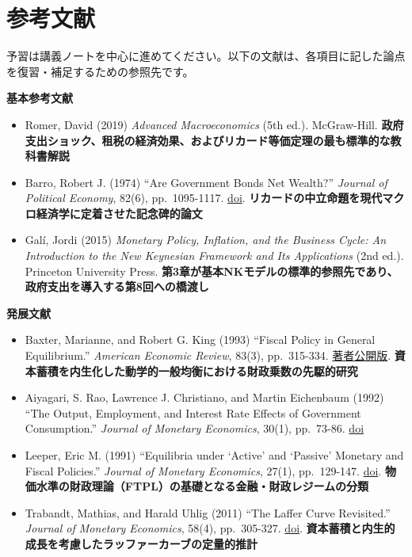 \documentclass[
  japanese,
  lualatex,
  ja=standard,
  12pt,
  a4paper]{ltjsarticle}
\providecommand{\tightlist}{%
  \setlength{\itemsep}{0pt}\setlength{\parskip}{0pt}}
\begin{document}
\clearpage

\section{参考文献}\label{ux53c2ux8003ux6587ux732e}

予習は講義ノートを中心に進めてください。以下の文献は、各項目に記した論点を復習・補足するための参照先です。

\textbf{基本参考文献}

\begin{itemize}
\tightlist
\item
  Romer, David (2019) \emph{Advanced Macroeconomics} (5th ed.).
  McGraw-Hill.
  \textbf{政府支出ショック、租税の経済効果、およびリカード等価定理の最も標準的な教科書解説}
\item
  Barro, Robert J. (1974) ``Are Government Bonds Net Wealth?''
  \emph{Journal of Political Economy}, 82(6), pp.~1095-1117.
  \href{https://doi.org/10.1086/260266}{doi}.
  \textbf{リカードの中立命題を現代マクロ経済学に定着させた記念碑的論文}
\item
  Galí, Jordi (2015) \emph{Monetary Policy, Inflation, and the Business
  Cycle: An Introduction to the New Keynesian Framework and Its
  Applications} (2nd ed.). Princeton University Press.
  \textbf{第3章が基本NKモデルの標準的参照先であり、政府支出を導入する第8回への橋渡し}
\end{itemize}

\textbf{発展文献}

\begin{itemize}
\tightlist
\item
  Baxter, Marianne, and Robert G. King (1993) ``Fiscal Policy in General
  Equilibrium.'' \emph{American Economic Review}, 83(3), pp.~315-334.
  \href{https://people.bu.edu/mbaxter/papers/fpol.pdf}{著者公開版}.
  \textbf{資本蓄積を内生化した動学的一般均衡における財政乗数の先駆的研究}
\item
  Aiyagari, S. Rao, Lawrence J. Christiano, and Martin Eichenbaum (1992)
  ``The Output, Employment, and Interest Rate Effects of Government
  Consumption.'' \emph{Journal of Monetary Economics}, 30(1), pp.~73-86.
  \href{https://doi.org/10.1016/0304-3932(92)90045-4}{doi}
\item
  Leeper, Eric M. (1991) ``Equilibria under `Active' and `Passive'
  Monetary and Fiscal Policies.'' \emph{Journal of Monetary Economics},
  27(1), pp.~129-147.
  \href{https://doi.org/10.1016/0304-3932(91)90007-B}{doi}.
  \textbf{物価水準の財政理論（FTPL）の基礎となる金融・財政レジームの分類}
\item
  Trabandt, Mathias, and Harald Uhlig (2011) ``The Laffer Curve
  Revisited.'' \emph{Journal of Monetary Economics}, 58(4), pp.~305-327.
  \href{https://doi.org/10.1016/j.jmoneco.2011.07.003}{doi}.
  \textbf{資本蓄積と内生的成長を考慮したラッファーカーブの定量的推計}
\end{itemize}
\end{document}
